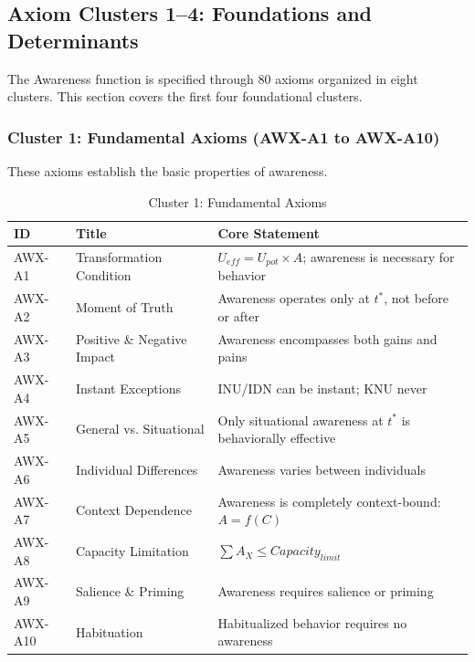 \subsection{Axiom Clusters 1--4: Foundations and Determinants}
\label{subsec:11-7-axioms-1-4}


The Awareness function is specified through 80 axioms organized in eight
clusters. This section covers the first four foundational clusters.

\subsubsection{Cluster 1: Fundamental Axioms (AWX-A1 to AWX-A10)}

These axioms establish the basic properties of awareness.

\begin{table}[htbp]
\centering
\caption{Cluster 1: Fundamental Axioms}
\label{tab:cluster1-axioms}
\renewcommand{\arraystretch}{1.3}
\small
\begin{tabular}{@{}llp{7cm}@{}}
\toprule
\textbf{ID} & \textbf{Title} & \textbf{Core Statement} \\
\midrule
AWX-A1 & Transformation Condition & $U_{eff} = U_{pot} \times A$; awareness is necessary for behavior \\
AWX-A2 & Moment of Truth & Awareness operates only at $t^*$, not before or after \\
AWX-A3 & Positive \& Negative Impact & Awareness encompasses both gains and pains \\
AWX-A4 & Instant Exceptions & INU/IDN can be instant; KNU never \\
AWX-A5 & General vs. Situational & Only situational awareness at $t^*$ is behaviorally effective \\
AWX-A6 & Individual Differences & Awareness varies between individuals \\
AWX-A7 & Context Dependence & Awareness is completely context-bound: $A = f(C)$ \\
AWX-A8 & Capacity Limitation & $\sum A_X \leq Capacity_{limit}$ \\
AWX-A9 & Salience \& Priming & Awareness requires salience or priming \\
AWX-A10 & Habituation & Habitualized behavior requires no awareness \\
\bottomrule
\end{tabular}
\end{table}


